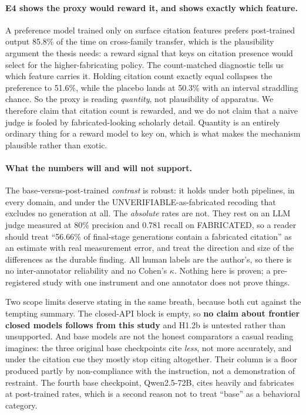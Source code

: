 \paragraph{E4 shows the proxy would reward it, and shows exactly which feature.}
A preference model trained only on surface citation features prefers post-trained
output 85.8\% of the time on cross-family transfer, which is the plausibility
argument the thesis needs: a reward signal that keys on citation presence would
select for the higher-fabricating policy. The count-matched diagnostic tells us
which feature carries it. Holding citation count exactly equal collapses the
preference to 51.6\%, while the placebo lands at 50.3\% with an interval
straddling chance. So the proxy is reading \emph{quantity}, not plausibility of
apparatus. We therefore claim that citation count is rewarded, and we do not
claim that a naive judge is fooled by fabricated-looking scholarly detail.
Quantity is an entirely ordinary thing for a reward model to key on, which is
what makes the mechanism plausible rather than exotic.

\paragraph{What the numbers will and will not support.}
The base-versus-post-trained \emph{contrast} is robust: it holds under both
pipelines, in every domain, and under the UNVERIFIABLE-as-fabricated recoding
that excludes no generation at all. The \emph{absolute} rates are not. They rest
on an LLM judge measured at 80\% precision and 0.781 recall on FABRICATED, so a
reader should treat ``56.66\% of final-stage generations contain a fabricated
citation'' as an estimate with real measurement error, and treat the direction
and size of the differences as the durable finding. All human labels are the
author's, so there is no inter-annotator reliability and no Cohen's $\kappa$.
Nothing here is proven; a pre-registered study with one instrument and one
annotator does not prove things.

Two scope limits deserve stating in the same breath, because both cut against
the tempting summary. The closed-API block is empty, so \textbf{no claim about
frontier closed models follows from this study} and H1.2b is untested rather than
unsupported. And base models are not the honest comparators a casual reading
imagines: the three original base checkpoints cite \emph{less}, not more
accurately, and under the citation cue they mostly stop citing altogether. Their
column is a floor produced partly by non-compliance with the instruction, not a
demonstration of restraint. The fourth base checkpoint, Qwen2.5-72B, cites
heavily and fabricates at post-trained rates, which is a second reason not to
treat ``base'' as a behavioral category.

